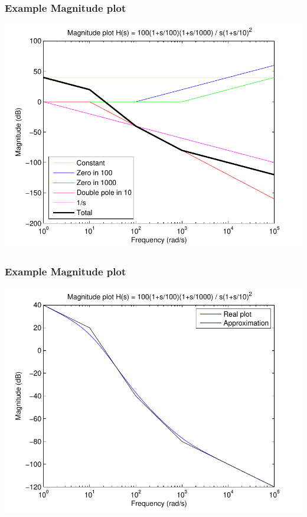 \begin{frame}
\frametitle{Example Magnitude plot}
\begin{center}
\includegraphics[width=0.7\linewidth]{MagnitudeParts}
\end{center}
\end{frame}

\begin{frame}
\frametitle{Example Magnitude plot}

\begin{center}
\includegraphics[scale=0.5]{MagnitudeApprox}
\end{center}


\end{frame}

